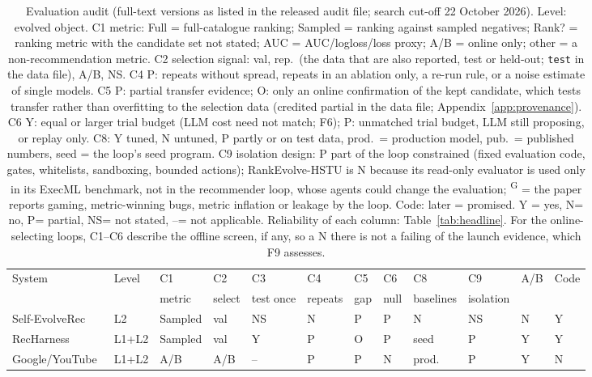 \documentclass[sigconf,nonacm]{acmart}
\newcommand{\yes}{\textsf{Y}\xspace}
\newcommand{\no}{\textsf{N}\xspace}
\newcommand{\ns}{\textsf{NS}\xspace}
\newcommand{\pa}{\textsf{P}\xspace}
\newcommand{\po}{\textsf{O}\xspace}
\newcommand{\na}{\textsf{--}\xspace}
\begin{document}
\begin{table}[t]
\caption{Evaluation audit (full-text versions as listed in the released audit file; search cut-off 22 October 2026). Level: evolved object. C1 metric: Full = full-catalogue ranking;
Sampled = ranking against sampled negatives; Rank? = ranking metric with the candidate set not stated; AUC =
AUC/logloss/loss proxy; A/B = online only; other = a non-recommendation metric. C2 selection
signal: val, rep.\ (the data that are also reported, test or held-out; \texttt{test} in the data file), A/B, \ns. C4 \pa: repeats without spread,
repeats in an ablation only, a re-run rule, or a noise estimate of single models. C5 \pa: partial transfer evidence; \po: only an online confirmation of the kept candidate, which tests transfer rather than overfitting to the selection data (credited partial in the data file; Appendix~\ref{app:provenance}). C6
\yes: equal or larger trial budget (LLM cost need not match; F6); \pa: unmatched trial budget, LLM still proposing, or replay only. C8: \yes tuned, \no untuned, \pa partly or on test data,
prod.\ = production model, pub.\ = published numbers, seed = the loop's seed program. C9 isolation design: \pa part of
the loop constrained (fixed evaluation code, gates, whitelists, sandboxing, bounded actions); RankEvolve-HSTU is \no because its read-only evaluator is used only in its ExecML benchmark, not in the recommender loop, whose agents could change the evaluation;
\textsuperscript{G} = the paper reports gaming, metric-winning bugs, metric inflation or leakage by the loop. Code: later = promised. \yes
= yes, \no = no, \pa = partial, \ns = not stated, \na = not applicable. Reliability of each column: Table~\ref{tab:headline}. For the online-selecting loops, C1--C6 describe the offline screen, if any, so a \no there is not a failing of the launch evidence, which F9 assesses.}\label{tab:audit}
\small
\begin{tabular}{@{}llllllllllll@{}}
\toprule
System & Level & C1 & C2 & C3 & C4 & C5 & C6 & C8 & C9 & A/B & Code \\
& & metric & select & test once & repeats & gap & null & baselines & isolation & & \\
\midrule
Self-EvolveRec~\cite{kim2026selfevolverec} & L2 & Sampled & val & \ns & \no & \pa & \pa & \no & \ns & \no & \yes \\
RecHarness~\cite{ling2026recharness} & L1+L2 & Sampled & val & \yes & \pa & \po & \pa & seed & \pa & \yes & \yes \\
Google/YouTube~\cite{wang2026selfevolving} & L1+L2 & A/B & A/B & \na & \pa & \pa & \no & prod. & \pa & \yes & \no \\

\end{tabular}
\end{table}
\end{document}
